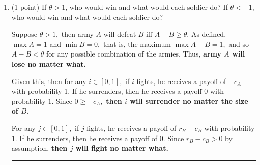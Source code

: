 \documentclass[11pt]{article}
\begin{document}
\begin{enumerate}
    \item (1 point) If \( \theta > 1 \), who would win and what would each soldier do? If \( \theta < -1 \), who would win and what would each soldier do?
\begin{solution}
    Suppose $\theta >1,$ then army $A$ will defeat $B$ iff $A - B \geq \theta.$ As defined, $\max A = 1$ and $\min B = 0,$ that is, the maximum $\max A - B = 1,$ and so $A - B < \theta$ for any possible combination of the armies. Thus, \textbf{army $A$ will lose no matter what.} 
    
    Given this, then for any $i \in [0,1],$ if $i$ fights, he receives a payoff of $-c_A$ with probability 1. If he surrenders, then he receives a payoff $0$ with probability $1.$ Since $0 \geq -c_{A},$ \textbf{then $i$ will surrender no matter the size of $B$.}

    For any $j \in [0,1],$ if $j$ fights, he receives a payoff of $r_B - c_B$ with probability $1.$ If he surrenders, then he receives a payoff of $0.$ Since $r_B - c_B > 0$ by assumption, \textbf{then $j$ will fight no matter what. }
\rule{\linewidth}{0.4pt}



\end{solution}
\end{enumerate}
\end{document}
